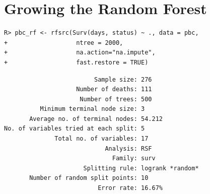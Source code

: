 \documentclass[nojss]{jss}\usepackage[]{graphicx}\usepackage[]{color}
\makeatletter
\newenvironment{kframe}{%
 \def\at@end@of@kframe{}%
 \ifinner\ifhmode%
  \def\at@end@of@kframe{\end{minipage}}%
  \begin{minipage}{\columnwidth}%
 \fi\fi%
 \def\FrameCommand##1{\hskip\@totalleftmargin \hskip-\fboxsep
 \colorbox{shadecolor}{##1}\hskip-\fboxsep
     \hskip-\linewidth \hskip-\@totalleftmargin \hskip\columnwidth}%
 \MakeFramed {\advance\hsize-\width
   \@totalleftmargin\z@ \linewidth\hsize
   \@setminipage}}%
 {\par\unskip\endMakeFramed%
 \at@end@of@kframe}
\newenvironment{knitrout}{}{} %
\makeatother
\begin{document}

\section{Growing the Random Forest}
\begin{knitrout}\footnotesize
{}\color{fgcolor}\begin{kframe}
\begin{verbatim}
R> pbc_rf <- rfsrc(Surv(days, status) ~ ., data = pbc, 
+                   ntree = 2000,
+                   na.action="na.impute", 
+                   fast.restore = TRUE)
\end{verbatim}
\end{kframe}
\end{knitrout}

\begin{knitrout}\footnotesize
{}\color{fgcolor}\begin{kframe}
\begin{verbatim}
                         Sample size: 276
                    Number of deaths: 111
                     Number of trees: 500
          Minimum terminal node size: 3
       Average no. of terminal nodes: 54.212
No. of variables tried at each split: 5
              Total no. of variables: 17
                            Analysis: RSF
                              Family: surv
                      Splitting rule: logrank *random*
       Number of random split points: 10
                          Error rate: 16.67%
\end{verbatim}
\end{kframe}
\end{knitrout}
\end{document}
